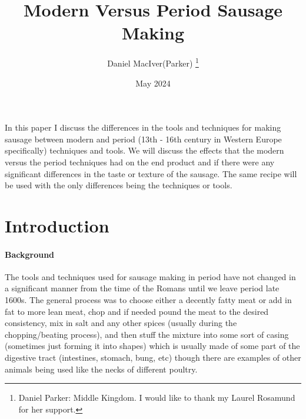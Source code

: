 \documentclass[letterpaper,11pt,leqno]{article}
\begin{document}
\title{Modern Versus Period Sausage Making}

\author{Daniel MacIver(Parker)
%
\thanks{Daniel Parker: Middle Kingdom. I would like to thank my Laurel Rosamund for her support.}}


\date{May 2024}   


\begin{titlepage}
\maketitle

In this paper I discuss the differences in the tools and techniques for making sausage between modern and period (13th - 16th century in Western Europe specifically) techniques and tools. We will discuss the effects that the modern versus the period techniques had on the end product and if there were any significant differences in the taste or texture of the sausage. The same recipe will be used with the only differences being the techniques or tools.

\end{titlepage}

\section{Introduction}\label{s:introduction}
 
\paragraph{Background} The tools and techniques used for sausage making in period have not changed in a significant manner from the time of the Romans until we leave period late 1600s. The general process was to choose either a decently fatty meat or add in fat to more lean meat, chop and if needed pound the meat to the desired consistency, mix in salt and any other spices (usually during the chopping/beating process), and then stuff the mixture into some sort of casing (sometimes just forming it into shapes) which is usually made of some part of the digestive tract (intestines, stomach, bung, etc) though there are examples of other animals being used like the necks of different poultry.
\end{document}
